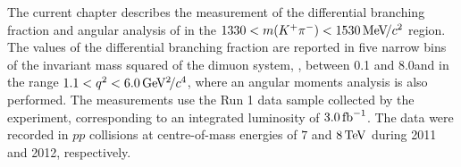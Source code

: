 The current chapter describes the measurement of the differential branching fraction and angular analysis of \BdToKpimm in the $1330<m({{K}^+}{{\pi}^-})<1530{\mathrm{\,Me\kern -0.1em V\!/}c^2}$ region. The values of the differential branching fraction are reported in five narrow bins of the invariant mass squared of the dimuon system, \qsq, between 0.1 and 8.0\gevgevcccc and in the range $1.1<{q^2}<6.0{\mathrm{\,Ge\kern -0.1em V^2\!/}c^4}$,  where an angular moments analysis is also performed. The measurements use the Run 1 data sample collected by the \lhcb experiment, corresponding to an integrated luminosity of $3.0\mbox{\,fb}^{-1}$. The data were recorded in $pp$ collisions at centre-of-mass energies of $7$ and $8\mathrm{\,Te\kern -0.1em V}$ during 2011 and 2012, respectively. 
